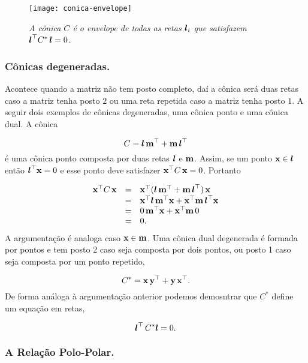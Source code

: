 \begin{figure}[!htb]
\centering
\texttt{[image: conica-envelope]}
\caption{\textit{A cônica $C$ é o envelope de todas as retas $\boldsymbol{l}_i$ que satisfazem $\boldsymbol{l}^\top C^*\,\boldsymbol{l}=0$.}}
\label{fig.conica-envelope}
\end{figure}

\subsubsection{Cônicas degeneradas.}

Acontece quando a matriz não tem posto completo, daí a cônica será duas retas caso a matriz tenha posto $2$ ou uma reta repetida caso a matriz tenha posto $1$. A seguir dois exemplos de cônicas degeneradas, uma cônica ponto e uma cônica dual. A cônica 

\begin{equation*}
C=\boldsymbol{l}\,{\bf m}^\top+{\bf m}\,\boldsymbol{l}^\top
\end{equation*}
é uma cônica ponto composta por duas retas $\boldsymbol{l}$ e ${\bf m}$. Assim, se um ponto $\mathbf{x}\in\boldsymbol{l}$ então $\boldsymbol{l}^\top\mathbf{x}=0$ e esse ponto deve satisfazer $\mathbf{x}^\top C\,\mathbf{x}=0$. Portanto

\begin{equation*}
\begin{array}{rcl}
\mathbf{x}^\top C\,\mathbf{x}&=&\mathbf{x}^\top(\boldsymbol{l}\,{\bf m}^\top+{\bf m}\,\boldsymbol{l}^\top)\,\mathbf{x}\\
&=&\mathbf{x}^\top\boldsymbol{l}\,{\bf m}^\top\mathbf{x}+\mathbf{x}^\top {\bf m}\,\boldsymbol{l}^\top\mathbf{x}\\
&=&0\,{\bf m}^\top\mathbf{x}+\mathbf{x}^\top{\bf m}\,0\\
&=&0.
\end{array}
\end{equation*}
A argumentação é analoga caso $\mathbf{x}\in{\bf m}$. Uma cônica dual degenerada é formada por pontos e tem posto 2 caso seja composta por dois pontos, ou posto 1 caso seja composta por um ponto repetido, 

\begin{equation*}
C^*=\mathbf{x}\,{\bf y}^\top+{\bf y}\,\mathbf{x}^\top.
\end{equation*}
De forma análoga à argumentação anterior podemos demosntrar que $C^*$ define um equação em retas,

\begin{equation*}
\boldsymbol{l}^\top\,C^*\boldsymbol{l}=0.
\end{equation*}

\subsubsection{A Relação Polo-Polar.}\label{sec.polo-polar}

